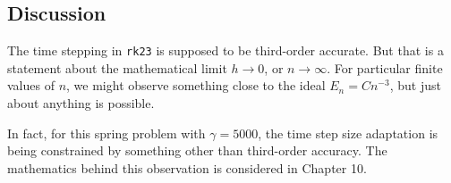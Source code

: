 \documentclass[11pt,twoside]{article}
\begin{document}
\subsection*{Discussion}

The time stepping in \texttt{rk23} is supposed to be third-order
accurate. But that is a statement about the mathematical limit
$h\to 0$, or $n\to \infty$. For particular finite values of $n$, we
might observe something close to the ideal $E_n=Cn^{-3}$, but just
about anything is possible. 

In fact, for this spring problem with $\gamma=5000$, the time step
size adaptation is being constrained by something other than
third-order accuracy. The mathematics behind this observation is
considered in Chapter 10.
\end{document}
